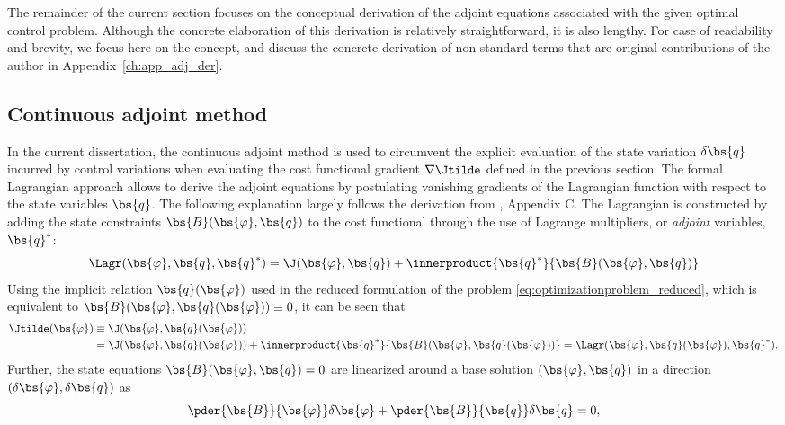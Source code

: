 	The remainder of the current section focuses on the conceptual derivation of the adjoint equations associated with the given optimal control problem. Although the concrete elaboration of this derivation is relatively straightforward, it is also lengthy. For case of readability and brevity, we focus here on the concept, and discuss the concrete derivation of non-standard terms that are original contributions of the author in Appendix~\ref{ch:app_adj_der}.

	\subsection{Continuous adjoint method}
	In the current dissertation, the continuous adjoint method is used to circumvent the explicit evaluation of the state variation $\delta \bs{q}$ incurred by control variations when evaluating the cost functional gradient $\nabla \Jtilde$ defined in the previous section. The formal Lagrangian approach \citep{troltzsch, borzinschulz} allows to derive the adjoint equations by postulating vanishing gradients of the Lagrangian function with respect to the state variables $\bs{q}$. The following explanation largely follows the derivation from \cite{goit2015optimal}, Appendix C. The Lagrangian is constructed by adding the state constraints $\bs{B}(\bs{\varphi}, \bs{q})$ to the cost functional through the use of Lagrange multipliers, or \emph{adjoint} variables, $\bs{q}^*$:
	\begin{equation}
		\Lagr(\bs{\varphi}, \bs{q}, \bs{q}^*) = \J(\bs{\varphi}, \bs{q}) + \innerproduct{\bs{q}^*}{\bs{B}(\bs{\varphi}, \bs{q})}
	\end{equation} 
	Using the implicit relation $\bs{q}(\bs{\varphi})$ used in the reduced formulation of the problem 
	\eqref{eq:optimizationproblem_reduced}, which is equivalent to $\bs{B}(\bs{\varphi}, \bs{q}(\bs{\varphi})) \equiv 0$, it can be seen that
	\begin{align}
	\Jtilde(\bs{\varphi}) &\equiv  \J(\bs{\varphi}, \bs{q}(\bs{\varphi})) \nonumber\\ 
						  & = \J(\bs{\varphi}, \bs{q}(\bs{\varphi})) + \innerproduct{\bs{q}^*}{\bs{B}(\bs{\varphi}, \bs{q}(\bs{\varphi}))} =\Lagr(\bs{\varphi}, \bs{q}(\bs{\varphi}), \bs{q}^*). \label{eq:jtilde_lagr}
	\end{align} 
	Further, the state equations $\bs{B}(\bs{\varphi}, \bs{q}) = 0$ are linearized around a base solution $(\bs{\varphi}, \bs{q})$ in a direction $(\delta \bs{\varphi}, \delta \bs{q})$ as
	\begin{equation}
		\pder{\bs{B}}{\bs{\varphi}} \delta \bs{\varphi} + \pder{\bs{B}}{\bs{q}} \delta \bs{q} = 0, 
	\end{equation}
